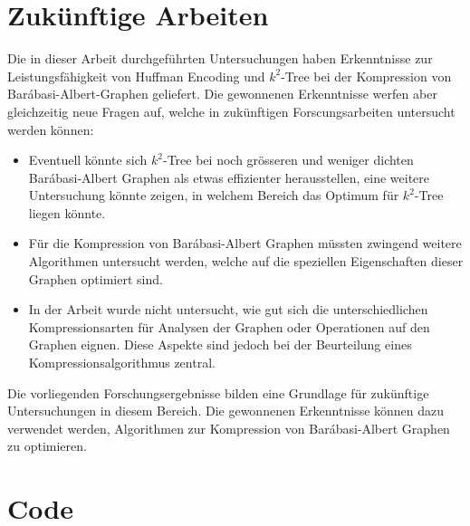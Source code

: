 \documentclass{ffhsthesis}
\begin{document}
\chapter{Zukünftige Arbeiten} %
Die in dieser Arbeit durchgeführten Untersuchungen haben Erkenntnisse zur Leistungsfähigkeit von Huffman Encoding und $k^2$-Tree bei der Kompression von Barábasi-Albert-Graphen geliefert. Die gewonnenen Erkenntnisse werfen aber gleichzeitig neue Fragen auf, welche in zukünftigen Forscungsarbeiten untersucht werden können:
\begin{itemize}
    \item Eventuell könnte sich $k^2$-Tree bei noch grösseren und weniger dichten Barábasi-Albert Graphen als etwas effizienter herausstellen, eine weitere Untersuchung könnte zeigen, in welchem Bereich das Optimum für $k^2$-Tree liegen könnte.
    \item Für die Kompression von Barábasi-Albert Graphen müssten zwingend weitere Algorithmen untersucht werden, welche auf die speziellen Eigenschaften dieser Graphen optimiert sind.
    \item In der Arbeit wurde nicht untersucht, wie gut sich die unterschiedlichen Kompressionsarten für Analysen der Graphen oder Operationen auf den Graphen eignen. Diese Aspekte sind jedoch bei der Beurteilung eines Kompressionsalgorithmus zentral.
\end{itemize}
Die vorliegenden Forschungsergebnisse bilden eine Grundlage für zukünftige Untersuchungen in diesem Bereich. Die gewonnenen Erkenntnisse können dazu verwendet werden,  Algorithmen zur Kompression von Barábasi-Albert Graphen zu optimieren.



% 
\appendix
\chapter{Code}
\end{document}
